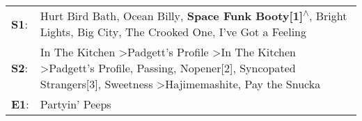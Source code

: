 \begin{supertabular}{p{0.03\textwidth}p{0.92\textwidth}}
 \textbf{S1}:  &                                                                                                                                                                                           Hurt Bird Bath\textsuperscript{}, \enspace Ocean Billy\textsuperscript{}, \enspace \textbf{Space Funk Booty[1]\textsuperscript{$\wedge$}}, \enspace Bright Lights, Big City\textsuperscript{}, \enspace The Crooked One\textsuperscript{}, \enspace I've Got a Feeling\textsuperscript{}  \enspace  \\
 \textbf{S2}:  &  In The Kitchen\textsuperscript{} \textgreater \enspace Padgett's Profile\textsuperscript{} \textgreater \enspace In The Kitchen\textsuperscript{} \textgreater \enspace Padgett's Profile\textsuperscript{}, \enspace Passing\textsuperscript{}, \enspace Nopener[2]\textsuperscript{}, \enspace Syncopated Strangers[3]\textsuperscript{}, \enspace Sweetness\textsuperscript{} \textgreater \enspace Hajimemashite\textsuperscript{}, \enspace Pay the Snucka\textsuperscript{}  \enspace  \\
 \textbf{E1}:  &                                                                                                                                                                                                                                                                                                                                                                                                                                                   Partyin' Peeps\textsuperscript{}  \enspace  \\
\end{supertabular}
